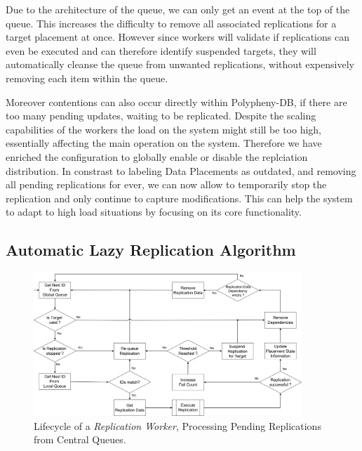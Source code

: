 Due to the architecture of the queue, we can only get an event at the top of the queue. This increases the difficulty to remove all associated replications 
for a target placement at once. However since workers will validate if replications can even be executed and can therefore identify suspended targets, they will
automatically cleanse the queue from unwanted replications, without expensively removing each item within the queue.

Moreover contentions can also occur directly within Polypheny-DB, if there are too many pending updates, waiting to be replicated.
Despite the scaling capabilities of the workers the load on the system might still be too high, essentially affecting the main operation on the system.
Therefore we have enriched the configuration to globally enable or disable the replciation distribution. In constrast to labeling Data Placements as outdated, 
and removing all pending replications for ever, we can now allow to temporarily stop the replication and only continue to capture modifications. This can help the system
to adapt to high load situations by focusing on its core functionality.\\



\subsection{Automatic Lazy Replication Algorithm}
\label{sec:algo}

\begin{figure}[t] 
    \centering
    \includegraphics[width=0.9\textwidth]{Figures/flow_worker.png}
    \caption{Lifecycle of a \textit{Replication Worker}, Processing Pending Replications from Central Queues.}
    \label{fig:flow_worker}
\end{figure}

